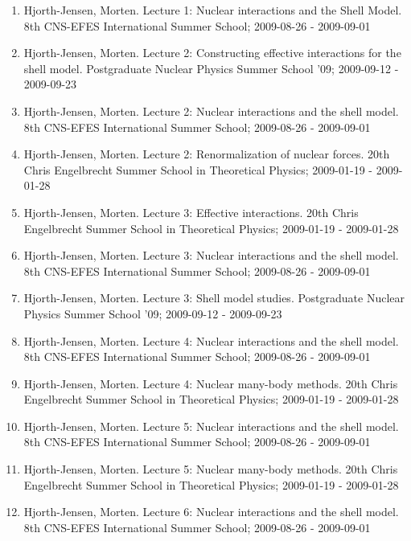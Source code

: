 \documentclass[a4wide,10pt]{article}
\begin{document}
\begin{enumerate}
\item Hjorth-Jensen, Morten.  Lecture 1: Nuclear interactions and the Shell Model. 8th CNS-EFES International Summer School; 2009-08-26 - 2009-09-01

\item Hjorth-Jensen, Morten.  Lecture 2: Constructing effective interactions for the shell model. Postgraduate Nuclear Physics Summer School '09; 2009-09-12 - 2009-09-23

\item Hjorth-Jensen, Morten.  Lecture 2: Nuclear interactions and the shell model. 8th CNS-EFES International Summer School; 2009-08-26 - 2009-09-01

\item Hjorth-Jensen, Morten.  Lecture 2: Renormalization of nuclear forces. 20th Chris Engelbrecht Summer School in Theoretical Physics; 2009-01-19 - 2009-01-28

\item Hjorth-Jensen, Morten.  Lecture 3: Effective interactions. 20th Chris Engelbrecht Summer School in Theoretical Physics; 2009-01-19 - 2009-01-28

\item Hjorth-Jensen, Morten.  Lecture 3: Nuclear interactions and the shell model. 8th CNS-EFES International Summer School; 2009-08-26 - 2009-09-01

\item Hjorth-Jensen, Morten.  Lecture 3: Shell model studies. Postgraduate Nuclear Physics Summer School '09; 2009-09-12 - 2009-09-23

\item Hjorth-Jensen, Morten.  Lecture 4: Nuclear interactions and the shell model. 8th CNS-EFES International Summer School; 2009-08-26 - 2009-09-01

\item Hjorth-Jensen, Morten.  Lecture 4: Nuclear many-body methods. 20th Chris Engelbrecht Summer School in Theoretical Physics; 2009-01-19 - 2009-01-28

\item Hjorth-Jensen, Morten.  Lecture 5: Nuclear interactions and the shell model. 8th CNS-EFES International Summer School; 2009-08-26 - 2009-09-01

\item Hjorth-Jensen, Morten.  Lecture 5: Nuclear many-body methods. 20th Chris Engelbrecht Summer School in Theoretical Physics; 2009-01-19 - 2009-01-28

\item Hjorth-Jensen, Morten.  Lecture 6: Nuclear interactions and the shell model. 8th CNS-EFES International Summer School; 2009-08-26 - 2009-09-01


\end{enumerate}
\end{document}
